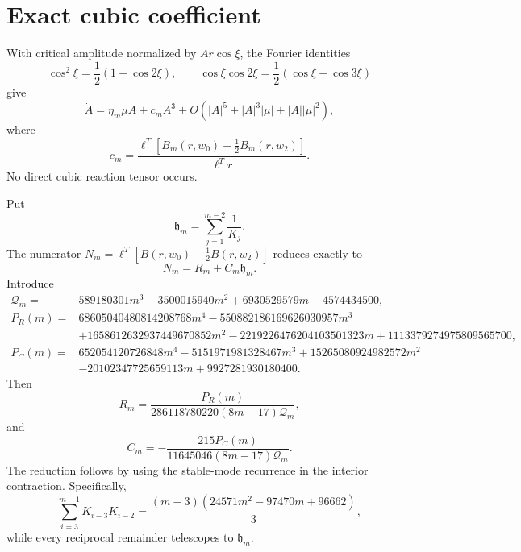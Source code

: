 \section*{Exact cubic coefficient}
With critical amplitude normalized by $A r\cos\xi$, the Fourier identities
\[
\cos^2\xi=\frac12(1+\cos2\xi),
\qquad
\cos\xi\cos2\xi=\frac12(\cos\xi+\cos3\xi)
\]
give
\[
\dot A=\eta_m\mu A+c_mA^3+
O(|A|^5+|A|^3|\mu|+|A||\mu|^2),
\]
where
\[
c_m=\frac{\ell^T\left[B_m(r,w_0)+\frac12B_m(r,w_2)\right]}{\ell^Tr}.
\]
No direct cubic reaction tensor occurs.

Put
\[
\mathfrak h_m=\sum_{j=1}^{m-2}\frac1{K_j}.
\]
The numerator $N_m=\ell^T[B(r,w_0)+\tfrac12B(r,w_2)]$ reduces exactly to
\[
N_m=R_m+C_m\mathfrak h_m.
\]
Introduce
\begin{align*}
\mathcal Q_m={}&589180301m^3-3500015940m^2+6930529579m-4574434500,\\
P_R(m)={}&68605040480814208768m^4-550882186169626030957m^3\\
&+1658612632937449670852m^2-2219226476204103501323m
+1113379274975809565700,\\
P_C(m)={}&652054120726848m^4-5151971981328467m^3
+15265080924982572m^2\\
&-20102347725659113m+9927281930180400.
\end{align*}
Then
\[
R_m=\frac{P_R(m)}{286118780220(8m-17)\mathcal Q_m},
\]
and
\[
C_m=-\frac{215P_C(m)}{11645046(8m-17)\mathcal Q_m}.
\]
The reduction follows by using the stable-mode recurrence in the interior
contraction.  Specifically,
\[
\sum_{i=3}^{m-1}K_{i-3}K_{i-2}
=\frac{(m-3)(24571m^2-97470m+96662)}3,
\]
while every reciprocal remainder telescopes to $\mathfrak h_m$.
